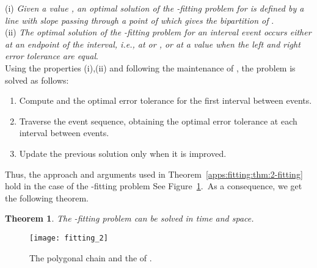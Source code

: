 \documentclass[11pt,letterpaper,english]{article}
\newtheorem{theorem}{Theorem}
\theoremstyle{definition}
\begin{document}
(i) \emph{Given a value , an optimal
  solution of the -fitting problem for  is defined by
  a line  with slope
   passing through a point  of  which gives the bipartition of }.\\

(ii) \emph{The optimal solution of the -fitting problem for
  an interval event  occurs either at an
  endpoint of the interval, i.e., at  or , or at
  a value 
  when the left and right error tolerance are equal}.\\

Using the properties (i),(ii) and following the maintenance of
, the problem is solved as follows:
\begin{enumerate}
\item Compute  and the optimal error tolerance for the first
  interval between events.
\item Traverse the event sequence, obtaining the optimal error
  tolerance at each interval between events.
\item Update the previous solution only when it is improved.
\end{enumerate}

Thus, the approach and arguments used in
Theorem~\ref{apps:fitting:thm:2-fitting} hold in the case of the
-fitting problem See
Figure~\ref{apps:fitting:fig:fitting}.~As a consequence, we get the
following theorem.

\begin{theorem}
  \label{apps:fitting:thm:fitting}
  The -fitting problem can be solved in 
  time and  space.
\end{theorem}





\begin{figure}[H]
  \centering
  \begin{minipage}{0.9\textwidth}
    \centering
    {\texttt{[image: fitting\_2]}}
    \caption{The polygonal chain  and the
       of .}
    \label{apps:fitting:fig:fitting}
  \end{minipage}
\end{figure}
\end{document}
